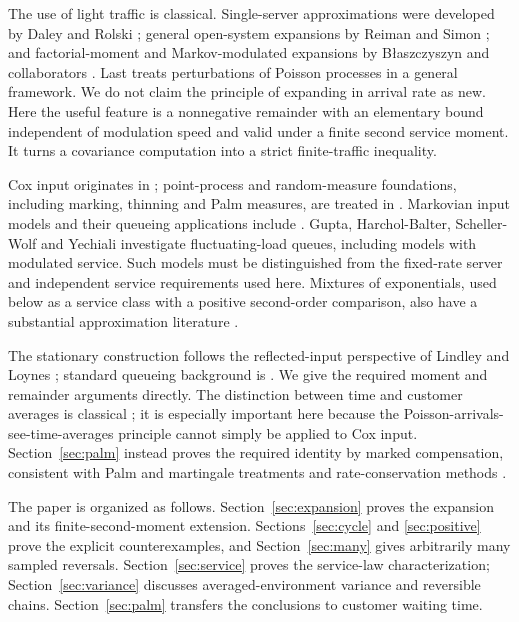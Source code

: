 \documentclass[10pt,a4paper]{amsart}
\numberwithin{equation}{section}
\newcommand{\1}{\mathbf 1}
\begin{document}
The use of light traffic is classical. Single-server approximations were developed by Daley and Rolski \cite{DR84,DR91,DR94}; general open-system expansions by Reiman and Simon \cite{RS89}; and factorial-moment and Markov-modulated expansions by B{\l}aszczyszyn and collaborators \cite{Blasz95,BFS95}. Last \cite{Last14} treats perturbations of Poisson processes in a general framework. We do not claim the principle of expanding in arrival rate as new. Here the useful feature is a nonnegative remainder with an elementary bound independent of modulation speed and valid under a finite second service moment. It turns a covariance computation into a strict finite-traffic inequality.

Cox input originates in \cite{Cox55}; point-process and random-measure foundations, including marking, thinning and Palm measures, are treated in \cite{DVJ03,DVJ08,Kallenberg17,LP18}. Markovian input models and their queueing applications include \cite{Neuts79,YN71,HL86}. Gupta, Harchol-Balter, Scheller-Wolf and Yechiali \cite{GHSY06} investigate fluctuating-load queues, including models with modulated service. Such models must be distinguished from the fixed-rate server and independent service requirements used here. Mixtures of exponentials, used below as a service class with a positive second-order comparison, also have a substantial approximation literature \cite{Whitt84}.

The stationary construction follows the reflected-input perspective of Lindley and Loynes \cite{Lindley52,Loynes62}; standard queueing background is \cite{Asmussen03}. We give the required moment and remainder arguments directly. The distinction between time and customer averages is classical \cite{Brumelle71,HS80}; it is especially important here because the Poisson-arrivals-see-time-averages principle \cite{Wolff82} cannot simply be applied to Cox input. Section~\ref{sec:palm} instead proves the required identity by marked compensation, consistent with Palm and martingale treatments \cite{Bremaud81,BB03} and rate-conservation methods \cite{Miyazawa94}.

The paper is organized as follows. Section~\ref{sec:expansion} proves the expansion and its finite-second-moment extension. Sections~\ref{sec:cycle} and \ref{sec:positive} prove the explicit counterexamples, and Section~\ref{sec:many} gives arbitrarily many sampled reversals. Section~\ref{sec:service} proves the service-law characterization; Section~\ref{sec:variance} discusses averaged-environment variance and reversible chains. Section~\ref{sec:palm} transfers the conclusions to customer waiting time.
\end{document}
